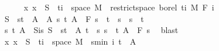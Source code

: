 \begin{isabellebody}
\ \ \ \ \isamarkupfalse%
\ {\isachardoublequoteopen}{\isacharparenleft}{\kern0pt}{\isasymlambda}x{\isachardot}{\kern0pt}\ x{\isacharparenright}{\kern0pt}\ {\isacharminus}{\kern0pt}{\isacharbackquote}{\kern0pt}\ S\ {\isasyminter}\ {\isacharparenleft}{\kern0pt}{\isacharbraceleft}{\kern0pt}ti{\isacharbraceright}{\kern0pt}\ {\isasymtimes}\ space\ M{\isacharparenright}{\kern0pt}\ {\isasymin}\ restrict{\isacharunderscore}{\kern0pt}space\ borel\ {\isacharbraceleft}{\kern0pt}ti{\isacharbraceright}{\kern0pt}\ {\isasymOtimes}\isactrlsub M\ F\ i{\isachardoublequoteclose}\isanewline
\ \ \ \ \isamarkupfalse%
\isanewline
\ \ \ \ \ \ \isamarkupfalse%
\ {\isachardoublequoteopen}S\ {\isasymin}\ {\isacharbraceleft}{\kern0pt}{\isacharbraceleft}{\kern0pt}s{\isacharless}{\kern0pt}{\isachardot}{\kern0pt}{\isachardot}{\kern0pt}t{\isacharbraceright}{\kern0pt}\ {\isasymtimes}\ A\ {\isacharbar}{\kern0pt}\ A\ s\ t{\isachardot}{\kern0pt}\ A\ {\isasymin}\ F\ s\ {\isasymand}\ t\ {\isasymle}\ s\ {\isasymand}\ s\ {\isacharless}{\kern0pt}\ t{\isacharbraceright}{\kern0pt}{\isachardoublequoteclose}\isanewline
\ \ \ \ \ \ \isamarkupfalse%
\ \isamarkupfalse%
\ s\ t\ A\ \ S{\isacharunderscore}{\kern0pt}is{\isacharcolon}{\kern0pt}\ {\isachardoublequoteopen}S\ {\isacharequal}{\kern0pt}\ {\isacharbraceleft}{\kern0pt}s{\isacharless}{\kern0pt}{\isachardot}{\kern0pt}{\isachardot}{\kern0pt}t{\isacharbraceright}{\kern0pt}\ {\isasymtimes}\ A{\isachardoublequoteclose}\ {\isachardoublequoteopen}t\ {\isasymle}\ s{\isachardoublequoteclose}\ {\isachardoublequoteopen}s\ {\isacharless}{\kern0pt}\ t{\isachardoublequoteclose}\ {\isachardoublequoteopen}A\ {\isasymin}\ F\ s{\isachardoublequoteclose}\ \isamarkupfalse%
\ blast\isanewline
\ \ \ \ \ \ \isamarkupfalse%
\ {\isachardoublequoteopen}{\isacharparenleft}{\kern0pt}{\isasymlambda}x{\isachardot}{\kern0pt}\ x{\isacharparenright}{\kern0pt}\ {\isacharminus}{\kern0pt}{\isacharbackquote}{\kern0pt}\ S\ {\isasyminter}\ {\isacharparenleft}{\kern0pt}{\isacharbraceleft}{\kern0pt}ti{\isacharbraceright}{\kern0pt}\ {\isasymtimes}\ space\ M{\isacharparenright}{\kern0pt}\ {\isacharequal}{\kern0pt}\ {\isacharbraceleft}{\kern0pt}s{\isacharless}{\kern0pt}{\isachardot}{\kern0pt}{\isachardot}{\kern0pt}min\ i\ t{\isacharbraceright}{\kern0pt}\ {\isasymtimes}\ A{\isachardoublequoteclose}\ \isamarkupfalse%

\end{isabellebody}
